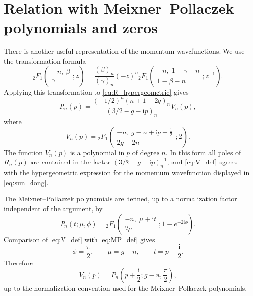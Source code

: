 \documentclass[10pt,a4paper]{amsart}
\newcommand{\ii}{\mathrm{i}}
\numberwithin{equation}{section}
\begin{document}
\section{Relation with Meixner--Pollaczek polynomials and zeros}\label{sec:mp}

There is another useful representation of the momentum wavefunctions.  We use the transformation
formula
\begin{equation}
  {}_2F_1\!\left(
  \begin{matrix}
  -n,\;\beta\\
  \gamma
  \end{matrix};z
  \right)
  =\frac{(\beta)_n}{(\gamma)_n}(-z)^n
  {}_2F_1\!\left(
  \begin{matrix}
  -n,\;1-\gamma-n\\
  1-\beta-n
  \end{matrix};z^{-1}
  \right).
  \label{eq:hypergeometric_transform}
\end{equation}
Applying this transformation to \eqref{eq:R_hypergeometric} gives
\begin{equation}
  R_n(p)=
  \frac{(-1/2)^n(n+1-2g)_n}{(3/2-g-\ii p)_n}
  V_n(p),
  \label{eq:R_V_factorization}
\end{equation}
where
\begin{equation}
  V_n(p)=
  {}_2F_1\!\left(
  \begin{matrix}
  -n,\; g-n+\ii p-\frac12\\
  2g-2n
  \end{matrix};2
  \right).
  \label{eq:V_def}
\end{equation}
The function $V_n(p)$ is a polynomial in $p$ of degree $n$.  In this form all poles of
$R_n(p)$ are contained in the factor $(3/2-g-\ii p)_n^{-1}$, and \eqref{eq:V_def} agrees with the
hypergeometric expression for the momentum wavefunction displayed in \eqref{eq:sun_dong}.

The Meixner--Pollaczek polynomials are defined, up to a normalization factor independent of the
argument, by
\begin{equation}
  P_n(t;\mu,\phi)=
  {}_2F_1\!\left(
  \begin{matrix}
  -n,\;\mu+\ii t\\
  2\mu
  \end{matrix};1-e^{-2\ii\phi}
  \right).
  \label{eq:MP_def}
\end{equation}
Comparison of \eqref{eq:V_def} with \eqref{eq:MP_def} gives
\begin{equation}
  \phi=\frac{\pi}{2},
  \qquad \mu=g-n,
  \qquad t=p+\frac{\ii}{2}.
  \label{eq:MP_parameters}
\end{equation}
Therefore
\begin{equation}
  V_n(p)=P_n\!\left(p+\frac{\ii}{2};g-n,\frac{\pi}{2}\right),
  \label{eq:V_MP}
\end{equation}
up to the normalization convention used for the Meixner--Pollaczek polynomials.
\end{document}
